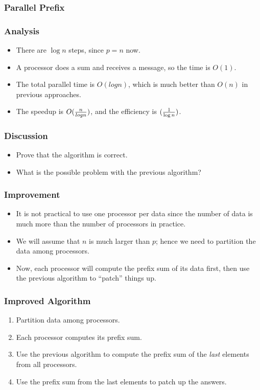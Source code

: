 \documentclass{beamer}
\begin{document}
\begin{CJK}{UTF8}{bsmi}
\begin{frame}
\frametitle{Parallel Prefix}
\centerline{}
\end{frame}

\begin{frame}
\frametitle{Analysis}
\begin{itemize}
\item There are $\log n$ steps, since $p = n$ now.
\item A processor does a sum and receives a message, so the time is $O(1)$.
\item The total parallel time is $O(log n)$, which is much better than $O(n)$ in previous approaches.
\item The speedup is $O({n \over log n})$, and the efficiency is $({1 \over {\log n}})$.
\end{itemize}
\end{frame}

\begin{frame}
\frametitle{Discussion}
\begin{itemize}
\item Prove that the algorithm is correct.
\item What is the possible problem with the previous algorithm?
\end{itemize}
\end{frame}


\begin{frame}
\frametitle{Improvement}
\begin{itemize}
\item It is not practical to use one processor per data since the number of data is much more than the number of processors in practice.
\item We will assume that $n$ is much larger than $p$; hence we need to partition the data among processors.
\item Now, each processor will compute the prefix sum of its data first, then use the previous algorithm to ``patch'' things up.
\end{itemize}
\end{frame}

\begin{frame}
\frametitle{Improved Algorithm}
\begin{enumerate}
\item Partition data among processors.
\item Each processor computes its prefix sum.
\item Use the previous algorithm to compute the prefix sum of the {\em
  last} elements from all processors.
\item Use the prefix sum from the last elements to patch up the answers.
\end{enumerate}
\end{frame}


\end{CJK}
\end{document}
